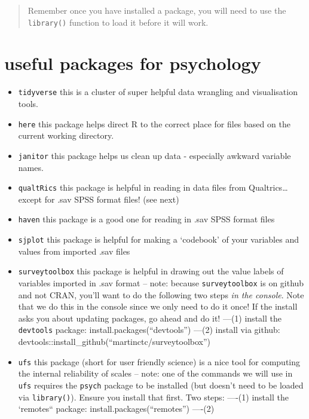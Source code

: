 \documentclass[
  letterpaper,
  DIV=11,
  numbers=noendperiod]{scrreprt}
\providecommand{\tightlist}{%
  \setlength{\itemsep}{0pt}\setlength{\parskip}{0pt}}\usepackage{longtable,booktabs,array}
\begin{document}
\begin{quote}
Remember once you have installed a package, you will need to use the
\texttt{library()} function to load it before it will work.
\end{quote}

\section{useful packages for
psychology}\label{useful-packages-for-psychology}

\begin{itemize}
\tightlist
\item
  \texttt{tidyverse} this is a cluster of super helpful data wrangling
  and visualisation tools.
\item
  \texttt{here} this package helps direct R to the correct place for
  files based on the current working directory.
\item
  \texttt{janitor} this package helps us clean up data - especially
  awkward variable names.
\item
  \texttt{qualtRics} this package is helpful in reading in data files
  from Qualtrics\ldots{} except for .sav SPSS format files! (see next)
\item
  \texttt{haven} this package is a good one for reading in .sav SPSS
  format files
\item
  \texttt{sjplot} this package is helpful for making a `codebook' of
  your variables and values from imported .sav files
\item
  \texttt{surveytoolbox} this package is helpful in drawing out the
  value labels of variables imported in .sav format -- note: because
  \texttt{surveytoolbox} is on github and not CRAN, you'll want to do
  the following two steps \emph{in the console}. Note that we do this in
  the console since we only need to do it once! If the install asks you
  about updating packages, go ahead and do it! ---(1) install the
  \texttt{devtools} package: install.packages(``devtools'') ---(2)
  install via github:
  devtools::install\_github(``martinctc/surveytoolbox'')
\item
  \texttt{ufs} this package (short for user friendly science) is a nice
  tool for computing the internal reliability of scales -- note: one of
  the commands we will use in \texttt{ufs} requires the \texttt{psych}
  package to be installed (but doesn't need to be loaded via
  \texttt{library()}). Ensure you install that first. Two steps: ----(1)
  install the `remotes`` package: install.packages(``remotes'') ----(2)

\end{itemize}
\end{document}
